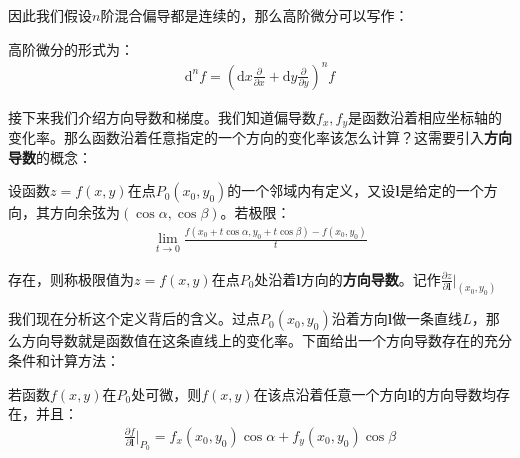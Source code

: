 \documentclass{ctexart}
\let\oldtextbf\textbf %
\renewcommand{\textbf}[1]{\textcolor{btex}{\oldtextbf{#1}}} %
\begin{document}
因此我们假设$n$阶混合偏导都是连续的，那么高阶微分可以写作：
\begin{tcolorbox}[
    colback=bac1,     %
    colframe=fra1,   %
    coltitle=white,             %
    coltext=tex1,
    title=高阶微分,
    fonttitle=\bfseries,        %
arc=3mm,                     %
breakable
]
高阶微分的形式为：
\begin{align*}
    \mathrm{d}^nf=(\mathrm{d}x\frac{\partial}{\partial x}+\mathrm{d}y\frac{\partial}{\partial y})^nf\tag{7-9}
\end{align*}
\end{tcolorbox}

接下来我们介绍方向导数和梯度。我们知道偏导数$f_x,f_y$是函数沿着相应坐标轴的变化率。那么函数沿着任意指定的一个方向的变化率该怎么计算？这需要引入\textbf{方向导数}的概念：
\begin{tcolorbox}[
    colback=bac2,     %
    colframe=fra2,   %
    coltitle=white,             %
    coltext=tex2,
    title=方向导数的定义,
    fonttitle=\bfseries,        %
arc=3mm,                     %
breakable
]
设函数$z=f(x,y)$在点$P_0(x_0,y_0)$的一个邻域内有定义，又设$\bm{l}$是给定的一个方向，其方向余弦为$(\cos\alpha,\cos\beta)$。若极限：
\begin{align*}
    \lim_{t\to 0}\frac{f(x_0+t\cos\alpha,y_0+t\cos\beta)-f(x_0,y_0)}{t}
\end{align*}

存在，则称极限值为$z=f(x,y)$在点$P_0$处沿着$\bm{l}$方向的\textbf{方向导数}。记作$\frac{\partial z}{\partial\bm{l}}|_{(x_0,y_0)}$
\end{tcolorbox}

我们现在分析这个定义背后的含义。过点$P_0(x_0,y_0)$沿着方向$\bm{l}$做一条直线$L$，那么方向导数就是函数值在这条直线上的变化率。下面给出一个方向导数存在的充分条件和计算方法：
\begin{tcolorbox}[
    colback=bac1,     %
    colframe=fra1,   %
    coltitle=white,             %
    coltext=tex1,
    title=方向导数存在的充分条件与计算方式,
    fonttitle=\bfseries,        %
arc=3mm,                     %
breakable
]
若函数$f(x,y)$在$P_0$处可微，则$f(x,y)$在该点沿着任意一个方向$\bm{l}$的方向导数均存在，并且：
\begin{align*}
    \frac{\partial  f}{\partial \bm{l}}|_{P_0}=f_x(x_0,y_0)\cos\alpha+f_y(x_0,y_0)\cos\beta\tag{7-10}
\end{align*}
\end{tcolorbox}
\end{document}
